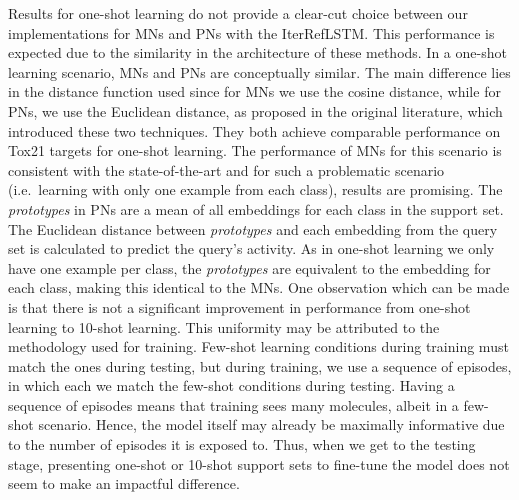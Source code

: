 Results for one-shot learning do not provide a clear-cut choice between our implementations for MNs and PNs with the IterRefLSTM. This performance is expected due to the similarity in the architecture of these methods. In a one-shot learning scenario, MNs and PNs are conceptually similar. The main difference lies in the distance function used since for MNs we use the cosine distance, while for PNs, we use the Euclidean distance, as proposed in the original literature, which introduced these two techniques. They both achieve comparable performance on Tox21 targets for one-shot learning. The performance of MNs for this scenario is consistent with the state-of-the-art and for such a problematic scenario (i.e.\ learning with only one example from each class), results are promising. The \textit{prototypes} in PNs are a mean of all embeddings for each class in the support set. The Euclidean distance between \textit{prototypes} and each embedding from the query set is calculated to predict the query's activity. As in one-shot learning we only have one example per class, the \textit{prototypes} are equivalent to the embedding for each class, making this identical to the MNs. One observation which can be made is that there is not a significant improvement in performance from one-shot learning to 10-shot learning. This uniformity may be attributed to the methodology used for training. Few-shot learning conditions during training must match the ones during testing, but during training, we use a sequence of episodes, in which each we match the few-shot conditions during testing. Having a sequence of episodes means that training sees many molecules, albeit in a few-shot scenario. Hence, the model itself may already be maximally informative due to the number of episodes it is exposed to. Thus, when we get to the testing stage, presenting one-shot or 10-shot support sets to fine-tune the model does not seem to make an impactful difference. 

